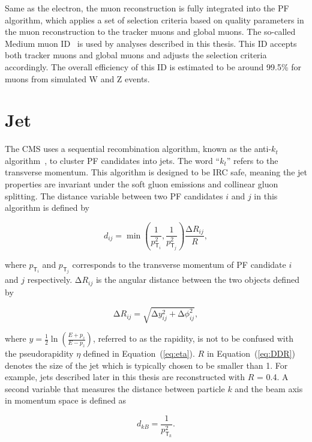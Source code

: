 Same as the electron, the muon reconstruction is fully integrated into the \ac{PF} algorithm, which applies a set of selection criteria based on quality parameters in the muon reconstruction to the tracker muons and global muons. The so-called Medium muon ID~\cite{CMS:2018rym} is used by analyses described in this thesis. This ID accepts both tracker muons and global muons and adjusts the selection criteria accordingly. The overall efficiency of this ID is estimated to be around 99.5\% for muons from simulated W and Z events.

\section{Jet}
\label{sec:Jet}

The \ac{CMS} uses a sequential recombination algorithm, known as the anti-$k_t$ algorithm~\cite{Cacciari:2008gp}, to cluster \ac{PF} candidates into jets. The word ``$k_t$'' refers to the transverse momentum. This algorithm is designed to be \ac{IRC} safe, meaning the jet properties are invariant under the soft gluon emissions and collinear gluon splitting. The distance variable between two \ac{PF} candidates $i$ and $j$ in this algorithm is defined by 

\begin{equation}
\label{eq:ak}
d_{ij} = \min(\frac{1}{p_{\textsf{T}_i}^2},\frac{1}{p_{\textsf{T}_j}^2})\frac{\mathrm{\Delta}R_{ij}}{R},
\end{equation}

where $p_{\textsf{T}_i}$ and $p_{\textsf{T}_j}$ corresponds to the transverse momentum of \ac{PF} candidate $i$ and $j$ respectively. $\mathrm{\Delta}R_{ij}$ is the angular distance between the two objects defined by

\begin{equation}
\mathrm{\Delta}R_{ij} = \sqrt{\mathrm{\Delta}y_{ij}^2+\mathrm{\Delta}\phi_{ij}^2},
\label{eq:DDR}
\end{equation}

where $y=\frac{1}{2}\ln(\frac{E+p_z}{E-p_z})$, referred to as the rapidity, is not to be confused with the pseudorapidity $\eta$ defined in Equation~(\ref{eq:eta}). $R$ in Equation~(\ref{eq:DDR}) denotes the size of the jet which is typically chosen to be smaller than 1. For example, jets described later in this thesis are reconstructed with $R$ = 0.4. A second variable that measures the distance between particle $k$ and the beam axis in momentum space is defined as 

\begin{equation}
d_{kB} = \frac{1}{p_{\textsf{T}_k}^2}.
\end{equation}

